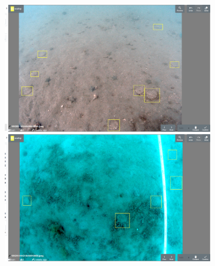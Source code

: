 \begin{figure}[h!]
\begin{subfigure}[t]{1.0\linewidth}
  \includegraphics[width=0.475\linewidth]{figures/annotation/screenshots/scallops.png}
  \hfill
  \includegraphics[width=0.475\linewidth]{figures/annotation/screenshots/scallops3.png}
  \caption{}

\end{subfigure}

\caption{ }
\label {fig:apple_examples}
\end{figure}






